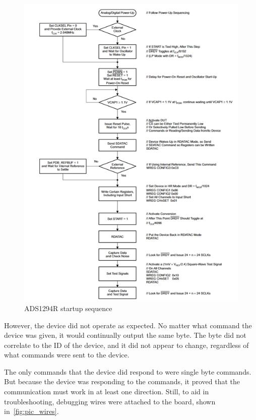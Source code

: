 \begin{figure}[!ht]
  \caption{ADS1294R startup sequence}\label{fig:ads_startup}
  \centering
  \includegraphics[width=1\columnwidth/2]{chapters/development/results/ADS_Startup_Sequence}
\end{figure}

However, the device did not operate as expected.
No matter what command the device was given, it would continually output the same byte.
The byte did not correlate to the ID of the device, and it did not appear to change, regardless of what commands were sent to the device.

The only commands that the device did respond to were single byte commands.
But because the device was responding to the commands, it proved that the communication must work in at least one direction.
Still, to aid in troubleshooting, debugging wires were attached to the board, shown in~\autoref{fig:pic_wires}.

